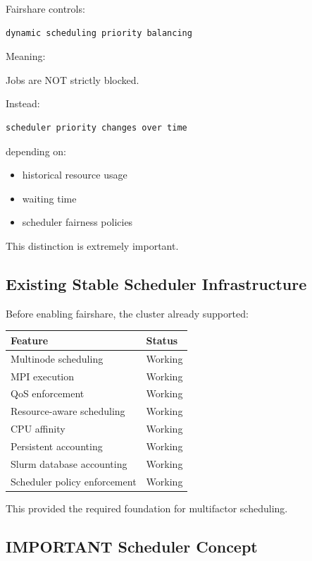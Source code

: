 \documentclass[11pt]{article}
\begin{document}
Fairshare controls:

\begin{verbatim}
dynamic scheduling priority balancing
\end{verbatim}

Meaning:

Jobs are NOT strictly blocked.

Instead:

\begin{verbatim}
scheduler priority changes over time
\end{verbatim}

depending on:

\begin{itemize}
\item historical resource usage
\item waiting time
\item scheduler fairness policies
\end{itemize}

This distinction is extremely important.
\subsection{Existing Stable Scheduler Infrastructure}
\label{sec:org603682e}

Before enabling fairshare, the cluster already supported:

\begin{center}
\begin{tabular}{ll}
Feature & Status\\
\hline
Multinode scheduling & Working\\
MPI execution & Working\\
QoS enforcement & Working\\
Resource-aware scheduling & Working\\
CPU affinity & Working\\
Persistent accounting & Working\\
Slurm database accounting & Working\\
Scheduler policy enforcement & Working\\
\end{tabular}
\end{center}

This provided the required foundation for multifactor scheduling.
\subsection{IMPORTANT Scheduler Concept}
\label{sec:orge2c5b5e}
\end{document}
